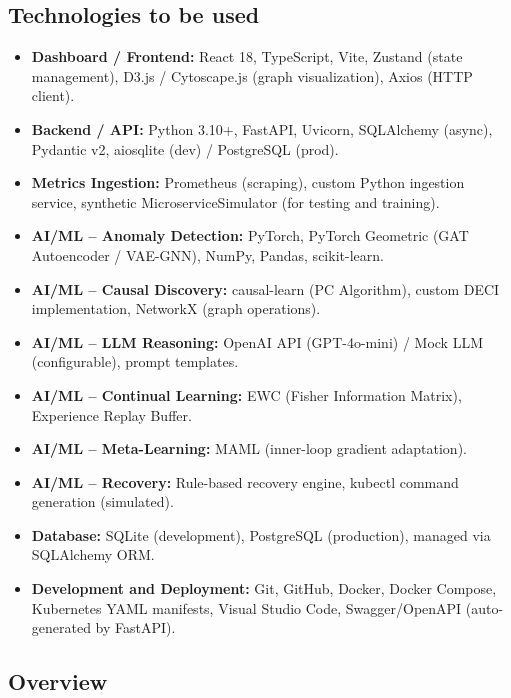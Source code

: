 \documentclass[11pt,a4paper]{article}
\begin{document}

\subsection{Technologies to be used}

\begin{itemize}
    \item \textbf{Dashboard / Frontend:} React 18, TypeScript, Vite, Zustand (state management), D3.js / Cytoscape.js (graph visualization), Axios (HTTP client).
    \item \textbf{Backend / API:} Python 3.10+, FastAPI, Uvicorn, SQLAlchemy (async), Pydantic v2, aiosqlite (dev) / PostgreSQL (prod).
    \item \textbf{Metrics Ingestion:} Prometheus (scraping), custom Python ingestion service, synthetic MicroserviceSimulator (for testing and training).
    \item \textbf{AI/ML -- Anomaly Detection:} PyTorch, PyTorch Geometric (GAT Autoencoder / VAE-GNN), NumPy, Pandas, scikit-learn.
    \item \textbf{AI/ML -- Causal Discovery:} causal-learn (PC Algorithm), custom DECI implementation, NetworkX (graph operations).
    \item \textbf{AI/ML -- LLM Reasoning:} OpenAI API (GPT-4o-mini) / Mock LLM (configurable), prompt templates.
    \item \textbf{AI/ML -- Continual Learning:} EWC (Fisher Information Matrix), Experience Replay Buffer.
    \item \textbf{AI/ML -- Meta-Learning:} MAML (inner-loop gradient adaptation).
    \item \textbf{AI/ML -- Recovery:} Rule-based recovery engine, kubectl command generation (simulated).
    \item \textbf{Database:} SQLite (development), PostgreSQL (production), managed via SQLAlchemy ORM.
    \item \textbf{Development and Deployment:} Git, GitHub, Docker, Docker Compose, Kubernetes YAML manifests, Visual Studio Code, Swagger/OpenAPI (auto-generated by FastAPI).
\end{itemize}


\subsection{Overview}
\end{document}
